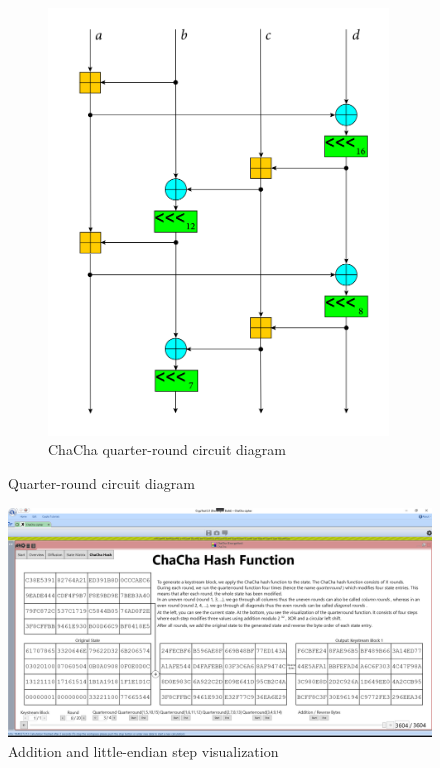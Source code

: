\begin{figure}
\begin{subfigure}[t]{0.5\textwidth}
  \includegraphics[width=0.99\textwidth]{figures/wiki-qr-circuit/chacha-wiki-qr-circuit.png}
  \caption{ChaCha quarter-round circuit diagram}
  \label{fig:wiki.qr.circuit.chacha}
\end{subfigure}
\caption{Quarter-round circuit diagram}
\label{fig:wiki.qr.circuit}
\centering
\includegraphics[width=\textwidth]{figures/ct2/chachahash/chachahash-end.png}
\caption{Addition and little-endian step visualization}
\label{fig:chachahash.end}
\end{figure}

